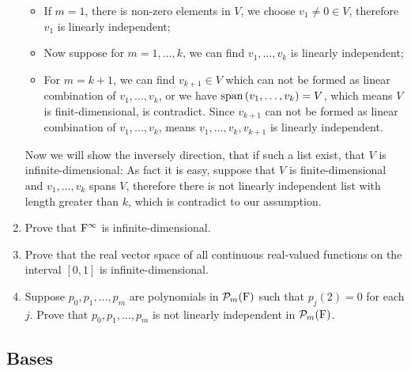 \begin{enumerate}
\begin{solution}
            \begin{itemize}
                \item If $m=1$, there is non-zero elements in $V$, we choose $v_1 \neq 0 \in V$, therefore $v_1$ is linearly independent;
                \item Now suppose for $m=1,\ldots,k$, we can find $v_1, \ldots, v_k$ is linearly independent;
                \item For $m = k+1$, we can find $v_{k+1} \in V$ which can not be formed as linear combination of $v_1, \ldots, v_k$, 
                    or we have $\text{span}\left(v_1, \ldots, v_k\right) = V$, which means $V$ is finit-dimensional, is contradict. Since $v_{k+1}$ 
                    can not be formed as linear combination of $v_1, \ldots, v_k$, means $v_1, \ldots, v_k, v_{k+1}$ is linearly independent.
            \end{itemize}

            Now we will show the inversely direction, that if such a list exist, that $V$ is infinite-dimensional:
            As fact it is easy, suppose that $V$ is finite-dimensional and $v_1, \ldots, v_k$ spans $V$, therefore there is 
            not linearly independent list with length greater than $k$, which is contradict to our assumption.
        \end{solution}
    \item Prove that $\mathrm{F}^{\infty}$ is infinite-dimensional.
        \begin{solution}
            
        \end{solution}
    \item Prove that the real vector space of all continuous real-valued functions on the interval $[0,1]$ is infinite-dimensional.
    \item Suppose $p_0,p_1,\ldots,p_m$ are polynomials in $\mathcal{P}_m(\mathrm{F})$ such that $p_j(2)=0$ for each $j$.
        Prove that $p_0,p_1,\ldots,p_m$ is not linearly independent in $\mathcal{P}_m(\mathrm{F})$.

\end{enumerate}

\subsection{Bases}

